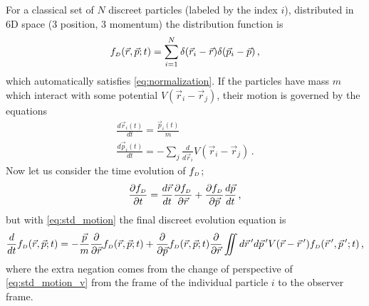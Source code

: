 For a classical set of $N$ discreet particles (labeled by the index $i$), distributed in 6D space (3 position, 3 momentum) the distribution function is 
\begin{equation}
  f_{{\scriptscriptstyle D}}(\vec{r}, \vec{p}; t) = 
  \sum\limits^{N}_{i=1} \delta(\vec{r}_{i} - \vec{r}) \delta(\vec{p}_{i} - \vec{p}) \,\text{,}
\end{equation}
which automatically satisfies \ref{eq:normalization}.
If the particles have mass $m$ which interact with some potential $V(\vec{r}_{i} - \vec{r}_{j})$, their motion is governed by the equations
\begin{subequations}\label{eq:std_motion}
\begin{gather}
  \frac{d\vec{r}_{i}(t)}{dt} = \frac{\vec{p}_{i}(t)}{m}\\
  \frac{d\vec{p}_{i}(t)}{dt} = -\sum\limits_{j} \frac{d}{d\vec{r}_{i}} V(\vec{r}_{i} - \vec{r}_{j}) \label{eq:std_motion_v} \,\text{.}
\end{gather}
\end{subequations}
Now let us consider the time evolution of $f_{{\scriptscriptstyle D}}$;
\begin{equation}
  \frac{\partial f_{{\scriptscriptstyle D}}}{\partial t} = 
  \frac{d\vec{r}}{dt} \frac{\partial f_{{\scriptscriptstyle D}}}{\partial \vec{r}} 
  + \frac{\partial f_{{\scriptscriptstyle D}}}{\partial \vec{p}} \frac{d\vec{p}}{dt} \,\text{,}
\end{equation}
but with \ref{eq:std_motion} the final discreet evolution equation is
\begin{equation} \label{eq:evolution_discreet}
  \frac{d}{dt} f_{{\scriptscriptstyle D}}(\vec{r}, \vec{p}; t) =
  -\frac{\vec{p}}{m} \frac{\partial}{\partial \vec{r}} f_{{\scriptscriptstyle D}}(\vec{r}, \vec{p}; t)
  + \frac{\partial}{\partial \vec{p}} f_{{\scriptscriptstyle D}} (\vec{r}, \vec{p}; t)
  \frac{\partial}{\partial \vec{r}} \iint d\vec{r}\,^{\prime} d\vec{p}\,^{\prime} V(\vec{r} - \vec{r}\,^{\prime}) f_{{\scriptscriptstyle D}}(\vec{r}\,^{\prime},\vec{p}\,^{\prime};t) \,\text{,}
\end{equation}
where the extra negation comes from the change of perspective of \ref{eq:std_motion_v} from the frame of the individual particle $i$ to the observer frame.

